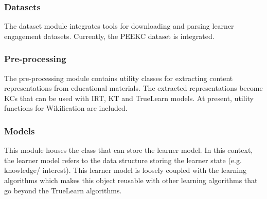 \documentclass[letterpaper]{article} %
\begin{document}



\subsubsection{Datasets}
The dataset module integrates tools for downloading and parsing learner engagement datasets. Currently, the PEEKC dataset is integrated.

\subsubsection{Pre-processing}
The pre-processing module contains utility classes for extracting content representations from educational materials. The extracted representations become KCs that can be used with IRT, KT and TrueLearn models. At present, utility functions for Wikification are included.

\subsubsection{Models}
This module houses the class that can store the learner model. In this context, the learner model refers to the data structure storing the learner state (e.g. knowledge/ interest). This learner model is loosely coupled with the learning algorithms which makes this object reusable with other learning algorithms that go beyond the TrueLearn algorithms.
\end{document}

